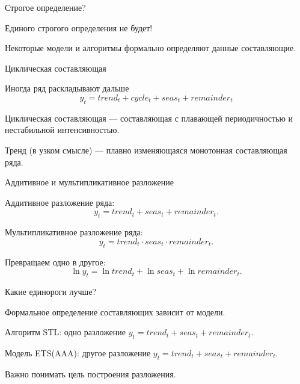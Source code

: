 \begin{frame}{Строгое определение?}

\pause
Единого строгого определения \alert{не} будет!

\pause
Некоторые модели и алгоритмы формально \alert{определяют} данные составляющие.

\end{frame}

\begin{frame}{Циклическая составляющая}

Иногда ряд раскладывают дальше
\[
y_t = trend_t + cycle_t + seas_t + remainder_t
\]

\pause
\alert{Циклическая составляющая} — составляющая с плавающей периодичностью и нестабильной интенсивностью. 


\pause
\alert{Тренд} (в узком смысле) —  плавно изменяющаяся монотонная составляющая ряда.

\end{frame}


\begin{frame}{Аддитивное и мультипликативное разложение}


\alert{Аддитивное} разложение ряда:
  \[
  y_t = trend_t + seas_t + remainder_t.
  \]
  
\pause
\alert{Мультипликативное} разложение ряда:
  \[
  y_t = trend_t \cdot seas_t \cdot remainder_t.
  \]

\pause
Превращаем одно в другое:
\[
  \ln y_t = \ln trend_t + \ln seas_t + \ln remainder_t.
\]
\end{frame}


\begin{frame}{Какие единороги лучше?}

Формальное определение составляющих \alert{зависит от модели}.

\pause
\alert{Алгоритм STL}: одно разложение $y_t = trend_t + seas_t + remainder_t$.

\pause
\alert{Модель ETS(AAA)}: другое разложение $y_t = trend_t + seas_t + remainder_t$.


\pause
Важно понимать \alert{цель построения} разложения. 

\end{frame}

